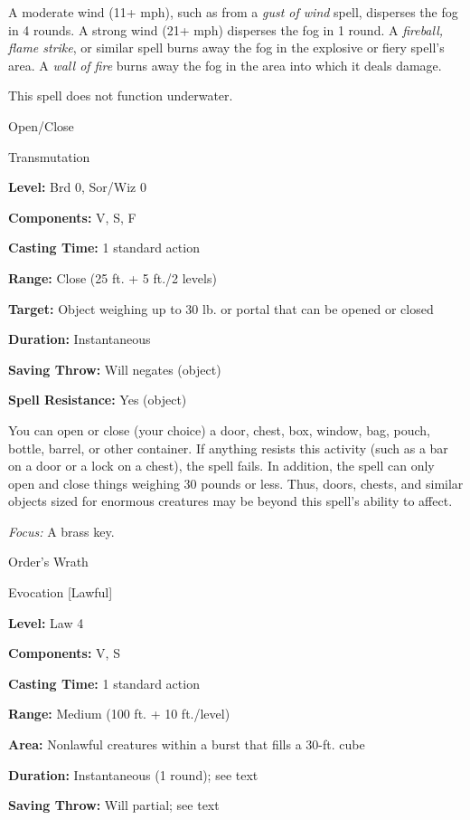 \documentclass{article}
\begin{document}
A moderate wind (11+ mph), such as from a \textit{gust of wind }spell, disperses 
the fog in 4 rounds. A strong wind (21+ mph) disperses the fog in 1 round. A \textit{fireball, 
flame strike}, or similar spell burns away the fog in the explosive or fiery spell's 
area. A \textit{wall of fire }burns away the fog in the area into which it deals 
damage.

This spell does not function underwater.

\vspace{12pt}
Open/Close

Transmutation

\textbf{Level:} Brd 0, Sor/Wiz 0

\textbf{Components:} V, S, F

\textbf{Casting Time:} 1 standard action

\textbf{Range:} Close (25 ft. + 5 ft./2 levels)

\textbf{Target:} Object weighing up to 30 lb. or portal that can be opened or closed

\textbf{Duration:} Instantaneous

\textbf{Saving Throw: }Will negates (object)

\textbf{Spell Resistance:} Yes (object)

You can open or close (your choice) a door, chest, box, window, bag, pouch, bottle, 
barrel, or other container. If anything resists this activity (such as a bar on 
a door or a lock on a chest), the spell fails. In addition, the spell can only 
open and close things weighing 30 pounds or less. Thus, doors, chests, and similar 
objects sized for enormous creatures may be beyond this spell's ability to affect.

\textit{Focus: }A brass key.

\vspace{12pt}
Order's Wrath

Evocation [Lawful]

\textbf{Level:} Law 4

\textbf{Components:} V, S

\textbf{Casting Time:} 1 standard action

\textbf{Range: }Medium (100 ft. + 10 ft./level)

\textbf{Area:} Nonlawful creatures within a burst that fills a 30-ft. cube

\textbf{Duration:} Instantaneous (1 round); see text

\textbf{Saving Throw: }Will partial; see text
\end{document}
